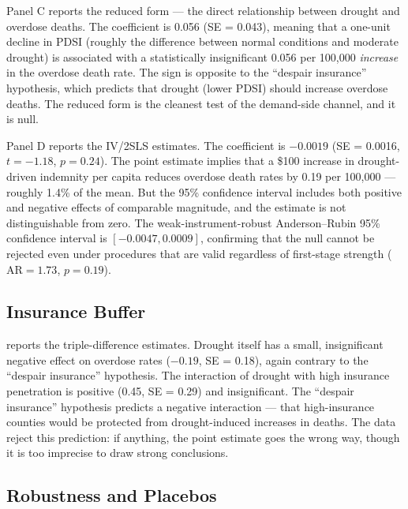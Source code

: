 \documentclass[12pt]{article}
\begin{document}
Panel C reports the reduced form --- the direct relationship between drought and overdose deaths. The coefficient is 0.056 (SE = 0.043), meaning that a one-unit decline in PDSI (roughly the difference between normal conditions and moderate drought) is associated with a statistically insignificant 0.056 per 100,000 \textit{increase} in the overdose death rate. The sign is opposite to the ``despair insurance'' hypothesis, which predicts that drought (lower PDSI) should increase overdose deaths. The reduced form is the cleanest test of the demand-side channel, and it is null.

Panel D reports the IV/2SLS estimates. The coefficient is $-0.0019$ (SE = 0.0016, $t = -1.18$, $p = 0.24$). The point estimate implies that a \$100 increase in drought-driven indemnity per capita reduces overdose death rates by 0.19 per 100,000 --- roughly 1.4\% of the mean. But the 95\% confidence interval includes both positive and negative effects of comparable magnitude, and the estimate is not distinguishable from zero. The weak-instrument-robust Anderson--Rubin 95\% confidence interval is $[-0.0047, 0.0009]$, confirming that the null cannot be rejected even under procedures that are valid regardless of first-stage strength ($\text{AR} = 1.73$, $p = 0.19$).

\subsection{Insurance Buffer}



 reports the triple-difference estimates. Drought itself has a small, insignificant negative effect on overdose rates ($-0.19$, SE = 0.18), again contrary to the ``despair insurance'' hypothesis. The interaction of drought with high insurance penetration is positive (0.45, SE = 0.29) and insignificant. The ``despair insurance'' hypothesis predicts a negative interaction --- that high-insurance counties would be protected from drought-induced increases in deaths. The data reject this prediction: if anything, the point estimate goes the wrong way, though it is too imprecise to draw strong conclusions.

\subsection{Robustness and Placebos}


\end{document}
